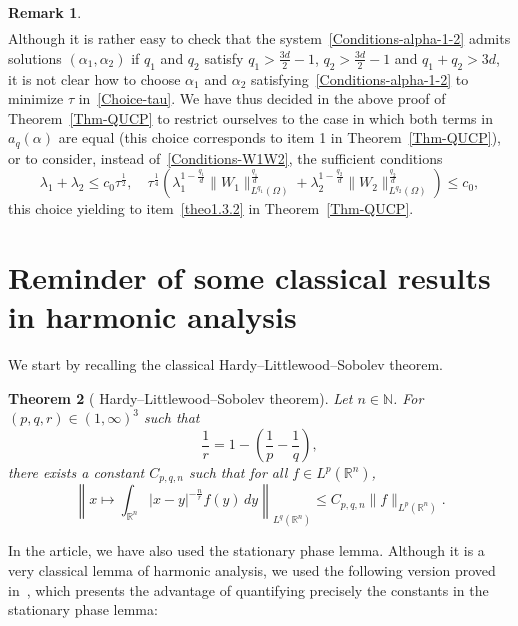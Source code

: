 \documentclass[10pt]{amsart}
\newtheorem{theo}{Theorem}[section]
\theoremstyle{definition}\newtheorem{defi}[theo]{Definition}\newtheorem{rema}[theo]{Remark}\newtheorem{exam}[theo]{Example}\newtheorem{exem}[theo]{Example}\newtheorem{nota}[theo]{Notation}
\newcommand*\R{\mathbb{R}}
\newcommand*\N{\mathbb{N}}
\newcommand*\ds{\displaystyle}
\renewcommand{\leq}{\leqslant}
\begin{document}
\begin{rema}
\begin{align*}
\end{align*}
Although it is rather easy to check that the system~\eqref{Conditions-alpha-1-2} admits solutions $(\alpha_1, \alpha_2)$ if $q_1$ and $q_2$ satisfy $q_1 > \frac{3d}{2} - 1$, $q_2 > \frac{3d}{2} - 1$ and $q_1 + q_2 > 3d$, it is not clear how to choose $\alpha_1$ and $\alpha_2$ satisfying~\eqref{Conditions-alpha-1-2} to minimize $\tau$ in~\eqref{Choice-tau}. We have thus decided in the above proof of Theorem~\ref{Thm-QUCP} to restrict ourselves to the case in which both terms in $a_q(\alpha)$ are equal (this choice corresponds to item 1 in Theorem~\ref{Thm-QUCP}), or to consider, instead of~\eqref{Conditions-W1W2}, the sufficient conditions
\begin{equation*}
\ds
\lambda_1 + \lambda_2 \leq c_0 \tau^{\frac{1}{2}}, \quad
\tau^{\frac{1}{4}} \left(\lambda_1^{1- \frac{q_1}{d}} \| W_{1} \|_{L^{q_1}(\Omega)}^{ \frac{q_1}{d}} + \lambda_2^{1- \frac{q_2}{d}} \| W_{2} \|_{L^{q_2}(\Omega)}^{ \frac{q_2}{d}}\right) \leq c_0,
\end{equation*}
this choice yielding to item~\eqref{theo1.3.2} in Theorem~\ref{Thm-QUCP}.
\end{rema}



\appendix
\section{Reminder of some classical results in harmonic analysis}

We start by recalling the classical Hardy--Littlewood--Sobolev theorem.

\begin{theo}[{\cite[Theorem~4.5.3.]{hormanderanalysis1}} Hardy--Littlewood--Sobolev theorem]\label{Thm-Hardy-Littlewood-Sobolev}
Let $n \in \N$. For $(p,q,r) \in (1, \infty)^3$ such that
\[
\frac{1}{r}=1-\left(\frac{1}{p}-\frac{1}{q}\right),
\]
there exists a constant $C_{p,q,n}$ such that for all $f \in L^p(\R^n)$,
\[
\left\| x\mapsto \int_{\R^n}|x-y|^{- \frac{n}{r} } f(y)\, d y
\right\|_{L^q(\R^n)}
\leq C_{p, q,n}
\|f\|_{L^p(\R^n)}.
\]
\end{theo}

In the article, we have also used the stationary phase lemma. Although it is a very classical lemma of harmonic analysis, we used the following version proved in~\cite{alazard2017stationary}, which presents the advantage of quantifying precisely the constants in the stationary phase lemma:
\end{document}
